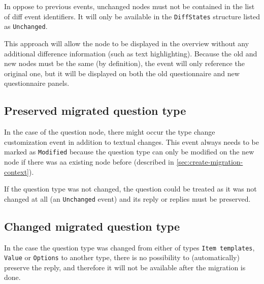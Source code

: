 In oppose to previous events, unchanged nodes must not be contained in the list of diff event identifiers.
It will only be available in the \texttt{DiffStates} structure listed as \texttt{Unchanged}.

This approach will allow the node to be displayed in the overview without any additional difference information (such as text highlighting).
Because the old and new nodes must be the same (by definition), the event will only reference the original one, but it will be displayed on both the old questionnaire and new questionnaire panels.

\subsection{Preserved migrated question type}

In the case of the question node, there might occur the type change customization event in addition to textual changes.
This event always needs to be marked as \texttt{Modified} because the question type can only be modified on the new node if there was aa existing node before (described in \ref{sec:create-migration-context}).

If the question type was not changed, the question could be treated as it was not changed at all (an \texttt{Unchanged} event) and its reply or replies must be preserved.

\subsection{Changed migrated question type}

In the case the question type was changed from either of types \texttt{Item templates}, \texttt{Value} or \texttt{Options} to another type, there is no possibility to (automatically) preserve the reply, and therefore it will not be available after the migration is done.
